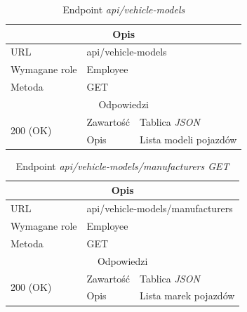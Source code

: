 \documentclass[eng,printmode,openany]{mgr}
\begin{document}
\begin{table}[H]
	\caption{Endpoint \textit{api/vehicle-models}}
	\begin{tabularx}{\textwidth}{|l|l|X|}
		\hline
		\multicolumn{3}{|c|}{Opis}
		\\ \hline
		URL                         & \multicolumn{2}{l|}{api/vehicle-models}
		\\ \hline
		Wymagane role               & \multicolumn{2}{l|}{Employee}
		\\ \hline
		Metoda                      & \multicolumn{2}{l|}{GET}
		\\ \hline
		\multicolumn{3}{|c|}{ Odpowiedzi}
		\\ \hline
		\multirow{2}{*}{200 (OK)}   & Zawartość         & Tablica \textit{JSON}
		\\ \cline{2-3}              & Opis         	    & Lista modeli pojazdów
		\\ \hline
	\end{tabularx}
\end{table}

\begin{table}[H]
	\caption{Endpoint \textit{api/vehicle-models/manufacturers GET}}
	\begin{tabularx}{\textwidth}{|l|l|X|}
		\hline
		\multicolumn{3}{|c|}{Opis}
		
		\\ \hline
		URL                         & \multicolumn{2}{l|}{api/vehicle-models/manufacturers}
		\\ \hline
		Wymagane role               & \multicolumn{2}{l|}{Employee}
		\\ \hline
		Metoda                      & \multicolumn{2}{l|}{GET}
		\\ \hline
		\multicolumn{3}{|c|}{Odpowiedzi}
		\\ \hline
		\multirow{2}{*}{200 (OK)}   & Zawartość        & Tablica \textit{JSON}
		\\ \cline{2-3}              & Opis         	   & Lista marek pojazdów
		\\ \hline
	\end{tabularx}
\end{table}
\end{document}
